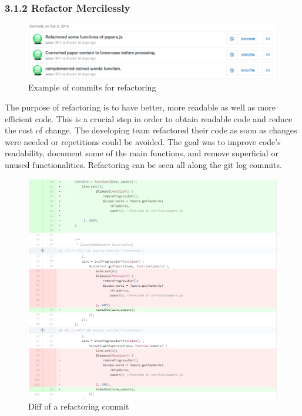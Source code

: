 \documentclass[]{article}
\begin{document}
\subsubsection{3.1.2 Refactor Mercilessly}\label{refactor-mercilessly}

\begin{figure}[htbp]
\centering
\includegraphics{images/refactor_commits.png}
\caption{Example of commits for refactoring}
\end{figure}

The purpose of refactoring is to have better, more readable as well as
more efficient code. This is a crucial step in order to obtain readable
code and reduce the cost of change. The developing team refactored their
code as soon as changes were needed or repetitions could be avoided. The
goal was to improve code's readability, document some of the main
functions, and remove superficial or unused functionalities. Refactoring
can be seen all along the git log commits. 

\begin{figure}[htbp]
\centering
\includegraphics{images/refactor.png}
\caption{Diff of a refactoring commit}
\end{figure}
\end{document}
